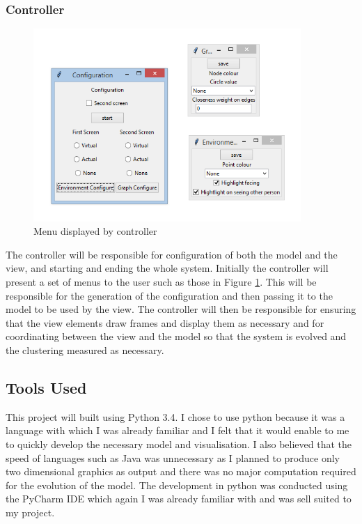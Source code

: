 \documentclass[12pt,a4paper]{article}
\begin{document}
\subsubsection{Controller}
\begin{figure}[htb]
\begin{center}
\caption{Menu displayed by controller}
\label{fig:menu}
\includegraphics[width=4in]{Config.png}
\end{center}
\end{figure}
The controller will be responsible for configuration of both the model and the view, and starting and ending the whole system. Initially the controller will present a set of menus to the user such as those in Figure \ref{fig:menu}. This will be responsible for the generation of the configuration and then passing it to the model to be used by the view. The controller will then be responsible for ensuring that the view elements draw frames and display them as necessary and for coordinating between the view and the model so that the system is evolved and the clustering measured as necessary.

\subsection{Tools Used}
This project will built using Python 3.4. I chose to use python because it was a language with which I was already familiar and I felt that it would enable to me to quickly develop the necessary model and visualisation. I also believed that the speed of languages such as Java was unnecessary as I planned to produce only two dimensional graphics as output and there was no major computation required for the evolution of the model. The development in python was conducted using the PyCharm IDE which again I was already familiar with and was sell suited to my project.
\end{document}
